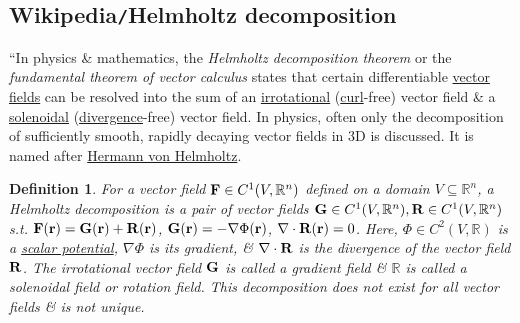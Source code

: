 \documentclass{article}
\newtheorem{definition}{Definition}
\begin{document}

\subsection{Wikipedia{\tt/}Helmholtz decomposition}
``In physics \& mathematics, the {\it Helmholtz decomposition theorem} or the {\it fundamental theorem of vector calculus} states that certain differentiable \href{https://en.wikipedia.org/wiki/Vector_field}{vector fields} can be resolved into the sum of an \href{https://en.wikipedia.org/wiki/Irrotational_vector_field}{irrotational} (\href{https://en.wikipedia.org/wiki/Curl_(mathematics)}{curl}-free) vector field \& a \href{https://en.wikipedia.org/wiki/Solenoidal}{solenoidal} (\href{https://en.wikipedia.org/wiki/Divergence}{divergence}-free) vector field. In physics, often only the decomposition of sufficiently smooth, rapidly decaying vector fields in 3D is discussed. It is named after \href{https://en.wikipedia.org/wiki/Hermann_von_Helmholtz}{\sc Hermann von Helmholtz}.

\begin{definition}
	For a vector field ${\bf F}\in C^1(V,\mathbb{R}^n)$ defined on a domain $V\subseteq\mathbb{R}^n$, a \emph{Helmholtz decomposition} is a pair of vector fields ${\bf G}\in C^1(V,\mathbb{R}^n),{\bf R}\in C^1(V,\mathbb{R}^n)$ s.t. ${\bf F}({\bf r}) = {\bf G}({\bf r}) + {\bf R}({\bf r})$, ${\bf G}({\bf r}) = -\nabla\Phi({\bf r})$, $\nabla\cdot{\bf R}({\bf r}) = 0$. Here, $\Phi\in C^2(V,\mathbb{R})$ is a \href{https://en.wikipedia.org/wiki/Scalar_potential}{scalar potential}, $\nabla\Phi$ is its gradient, \& $\nabla\cdot{\bf R}$ is the divergence of the vector field ${\bf R}$. The irrotational vector field ${\bf G}$ is called a \emph{gradient field} \& $\mathbb{R}$ is called a \emph{solenoidal field} or \emph{rotation field}. This decomposition does not exist for all vector fields \& is not unique.
\end{definition}
\end{document}
